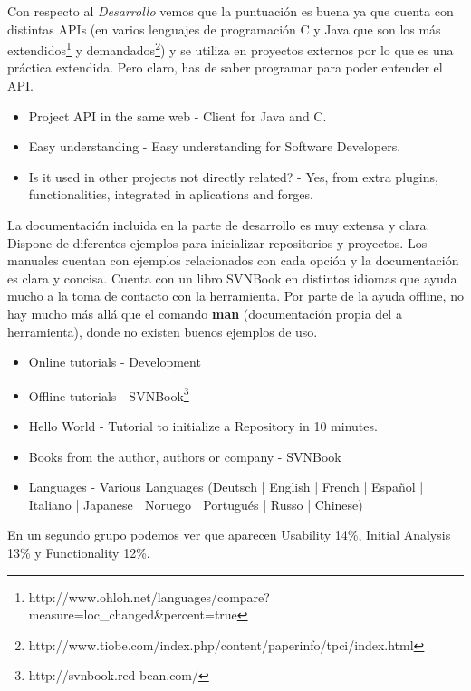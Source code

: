 \documentclass[11pt]{scrartcl}
\begin{document}
\par Con respecto al \emph{Desarrollo} vemos que la puntuaci\'on es buena ya que cuenta con distintas APIs (en varios lenguajes de programaci\'on C y Java que son los más extendidos\footnote{http://www.ohloh.net/languages/compare?measure=loc\_changed\&percent=true} y demandados\footnote{http://www.tiobe.com/index.php/content/paperinfo/tpci/index.html}) y se utiliza en proyectos externos por lo que es una pr\'actica extendida. Pero claro, has de saber programar para poder entender el API.

\begin{itemize}
    \item Project API in the same web - Client for Java and C.
    \item Easy understanding - Easy understanding for Software Developers. 
    \item Is it used in other projects not directly related? - Yes, from extra plugins, functionalities, integrated in aplications and forges.
\end{itemize}
  
\par La documentaci\'on incluida en la parte de desarrollo es muy extensa y clara. Dispone de diferentes ejemplos para inicializar repositorios y proyectos. Los manuales cuentan con ejemplos relacionados con cada opci\'on y la documentaci\'on es clara y concisa. Cuenta con un libro SVNBook en distintos idiomas que ayuda mucho a la toma de contacto con la herramienta. Por parte de la ayuda offline, no hay mucho m\'as all\'a que el comando \textbf{man} (documentaci\'on propia del a herramienta), donde no existen buenos ejemplos de uso.

\begin{itemize}
    \item Online tutorials - Development
    \item Offline tutorials - SVNBook\footnote{http://svnbook.red-bean.com/}
    \item Hello World - Tutorial to initialize a Repository in 10 minutes.
    \item Books from the author, authors or company -  SVNBook
    \item Languages - Various Languages (Deutsch | English | French | Espa\~nol | Italiano | Japanese | Noruego | Portugu\'es | Russo | Chinese)
\end{itemize}

\par En un segundo grupo podemos ver que aparecen Usability 14\%, Initial Analysis 13\% y Functionality 12\%.
\end{document}
